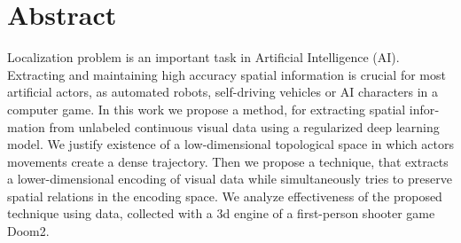 
\chapter{Abstract}

\begin{english}

Localization problem is an important task in Artificial Intelligence (AI).
Extracting and maintaining high accuracy spatial information is crucial for most artificial actors, as automated robots, self-driving vehicles or AI characters in a computer game.
In this work we propose a method, for extracting spatial information from unlabeled continuous visual data using a regularized deep learning model.
We justify existence of a low-dimensional topological space in which actors movements create a dense trajectory.
Then we propose a technique, that extracts a lower-dimensional encoding of visual data while simultaneously  tries to preserve spatial relations in the encoding space.
We analyze effectiveness of the proposed technique using data, collected with a 3d engine of a first-person shooter game Doom2.

\end{english}

